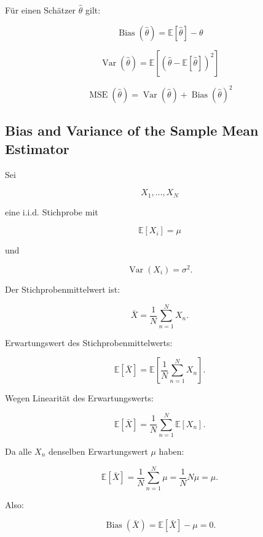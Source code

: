 \documentclass[11pt,a4paper]{scrartcl}
\begin{document}
\begin{answerbox}
    Für einen Schätzer \(\hat\theta\) gilt:

    \[
        \boxed{
            \operatorname{Bias}(\hat\theta)
            =
            \mathbb{E}[\hat\theta]-\theta
        }
    \]

    \[
        \boxed{
            \operatorname{Var}(\hat\theta)
            =
            \mathbb{E}
            \left[
                \left(\hat\theta-\mathbb{E}[\hat\theta]\right)^2
            \right]
        }
    \]

    \[
        \boxed{
            \operatorname{MSE}(\hat\theta)
            =
            \operatorname{Var}(\hat\theta)
            +
            \operatorname{Bias}(\hat\theta)^2
        }
    \]
\end{answerbox}

\subsection{Bias and Variance of the Sample Mean Estimator}

\begin{notebox}
    Sei

    \[
        X_1,\dots,X_N
    \]

    eine i.i.d. Stichprobe mit

    \[
        \mathbb{E}[X_i]=\mu
    \]

    und

    \[
        \operatorname{Var}(X_i)=\sigma^2.
    \]

    Der Stichprobenmittelwert ist:

    \[
        \bar X
        =
        \frac{1}{N}
        \sum_{n=1}^{N} X_n.
    \]
\end{notebox}

\begin{calculationbox}
    Erwartungswert des Stichprobenmittelwerts:

    \[
        \mathbb{E}[\bar X]
        =
        \mathbb{E}
        \left[
            \frac{1}{N}
            \sum_{n=1}^{N} X_n
        \right].
    \]

    Wegen Linearität des Erwartungswerts:

    \[
        \mathbb{E}[\bar X]
        =
        \frac{1}{N}
        \sum_{n=1}^{N}
        \mathbb{E}[X_n].
    \]

    Da alle \(X_n\) denselben Erwartungswert \(\mu\) haben:

    \[
        \mathbb{E}[\bar X]
        =
        \frac{1}{N}
        \sum_{n=1}^{N}
        \mu
        =
        \frac{1}{N}N\mu
        =
        \mu.
    \]

    Also:

    \[
        \operatorname{Bias}(\bar X)
        =
        \mathbb{E}[\bar X]-\mu
        =
        0.
    \]
\end{calculationbox}
\end{document}
